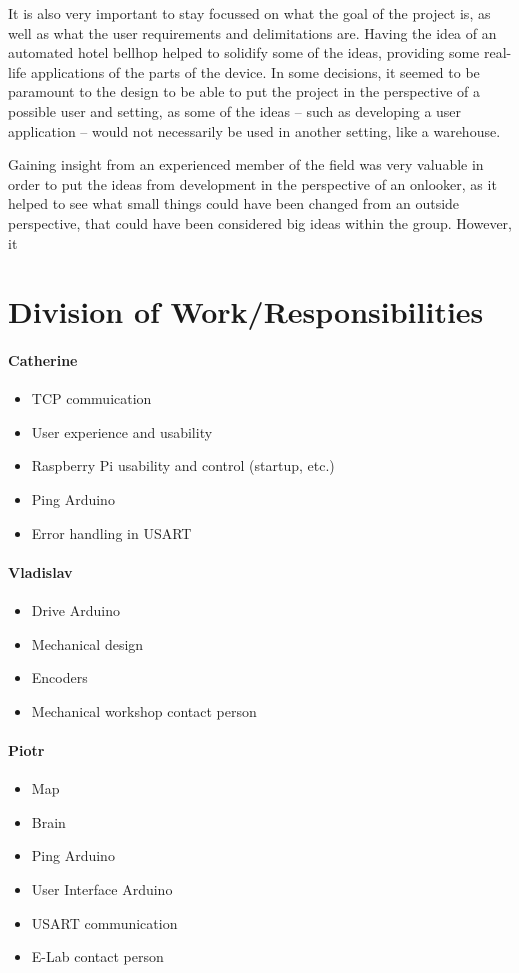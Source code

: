 \documentclass[11pt]{article}
\begin{document}
It is also very important to stay focussed on what the goal of the project is, as well as what the user requirements and delimitations are. Having the idea of an automated hotel bellhop helped to solidify some of the ideas, providing some real-life applications of the parts of the device. In some decisions, it seemed to be paramount to the design to be able to put the project in the perspective of a possible user and setting, as some of the ideas -- such as developing a user application -- would not necessarily be used in another setting, like a warehouse.

Gaining insight from an experienced member of the field was very valuable in order to put the ideas from development in the perspective of an onlooker, as it helped to see what small things could have been changed from an outside perspective, that could have been considered big ideas within the group. However, it
\newpage
\section{Division of Work/Responsibilities}
\paragraph{Catherine}
\begin{itemize}
\item{TCP commuication}
\item{User experience and usability}
\item{Raspberry Pi usability and control (startup, etc.)}
\item{Ping Arduino}
\item{Error handling in USART}
\end{itemize}
\paragraph{Vladislav}
\begin{itemize}
\item{Drive Arduino}
\item{Mechanical design}
\item{Encoders}
\item{Mechanical workshop contact person}
\end{itemize}
\paragraph{Piotr}
\begin{itemize}
\item{Map}
\item{Brain}
\item{Ping Arduino}
\item{User Interface Arduino}
\item{USART communication}
\item{E-Lab contact person}
\end{itemize}
\end{document}
